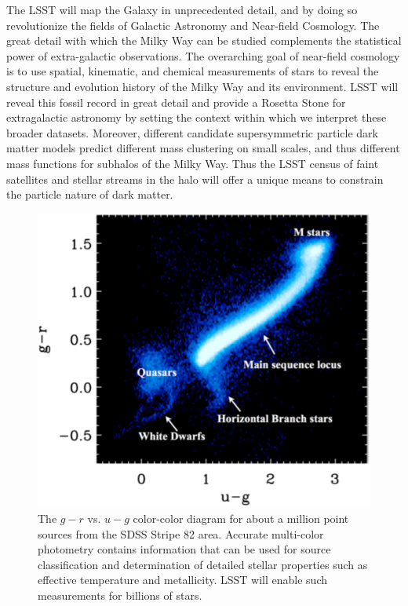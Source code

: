 The LSST will map the Galaxy in unprecedented detail, and by doing so revolutionize the fields of Galactic
Astronomy and Near-field Cosmology. The great detail with which the Milky Way can be studied complements
the statistical power of extra-galactic observations.  The overarching goal of near-field cosmology is to use
spatial, kinematic, and chemical measurements of stars to reveal the structure and evolution history of the Milky Way
and its environment. LSST will reveal this fossil record in great detail and provide a Rosetta Stone for extragalactic
astronomy by setting the context within which we interpret these
broader datasets. Moreover, different candidate supersymmetric
particle dark matter models predict different mass clustering on small
scales, and thus different mass functions for subhalos of the Milky
Way.  Thus the LSST census of faint satellites and stellar streams in
the halo will offer a unique means to constrain the
particle nature of dark matter.


\begin{figure}
\includegraphics[width=1.0\hsize,clip]{MarlaUGR}
\caption{The $g-r$ vs. $u-g$ color-color diagram for about a million point sources
from the SDSS Stripe 82 area. Accurate multi-color photometry
contains information that can be used for source classification and determination of
detailed stellar properties such as effective temperature and metallicity. LSST will
enable such measurements for billions of stars.}
\label{Fig:FeH}
\end{figure}


